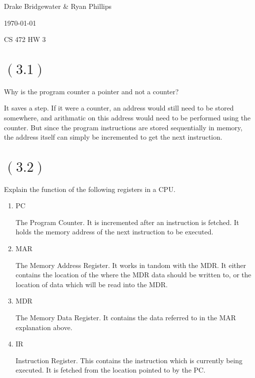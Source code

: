 \documentclass[letterpaper,12pt,titlepage]{article}
\def\name{Drake Bridgewater \& Ryan Phillips}
\begin{document}
\hfill \name

\hfill \today

\hfill CS 472 HW 3

\section*{$(3.1)$} Why is the program counter a pointer and not a counter? 

\begin{mdframed}[style=MyFrame]

It saves a step. If it were a counter, an address would still need to be stored somewhere, and arithmatic on this address would need to be performed using the counter. But since the program instructions are stored sequentially in memory, the address itself can simply be incremented to get the next instruction.

\end{mdframed}
  
\section*{$(3.2)$} Explain the function of the following registers in a CPU.

\renewcommand{\labelenumi}{\alph{enumi})}
\begin{enumerate}
\item PC

\begin{mdframed}[style=MyFrame]

The Program Counter. It is incremented after an instruction is fetched. It holds the memory address of the next instruction to be executed.

\end{mdframed}

\item MAR

\begin{mdframed}[style=MyFrame]

The Memory Address Register. It works in tandom with the MDR. It either contains the location of the where the MDR data should be written to, or the location of data which will be read into the MDR.

\end{mdframed}

\item MDR 

\begin{mdframed}[style=MyFrame]

The Memory Data Register. It contains the data referred to in the MAR explanation above.

\end{mdframed}
\newpage
\item IR

\begin{mdframed}[style=MyFrame]

Instruction Register. This contains the instruction which is currently being executed. It is fetched from the location pointed to by the PC.

\end{mdframed}

\end{enumerate}
\end{document}
